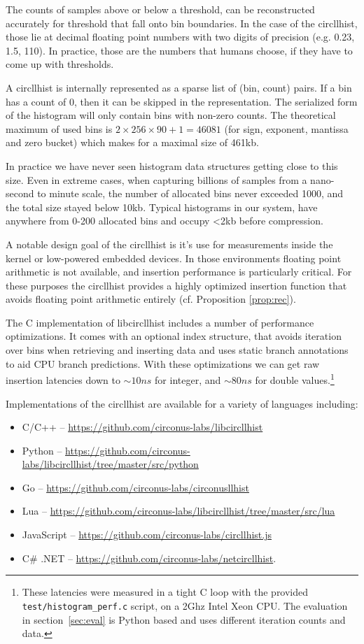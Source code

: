 \documentclass{article}
\theoremstyle{plain}
\theoremstyle{remark}
\begin{document}
The counts of samples above or below a threshold, can be reconstructed accurately for threshold
that fall onto bin boundaries. In the case of the circllhist, those lie at decimal floating point
numbers with two digits of precision (e.g. 0.23, 1.5, 110). In practice, those are the numbers
that humans choose, if they have to come up with thresholds.

A circllhist is internally represented as a sparse list of (bin, count) pairs.  If a bin has a count
of 0, then it can be skipped in the representation.  The serialized form of the histogram will only
contain bins with non-zero counts.  The theoretical maximum of used bins is $2 \times 256 \times 90
+ 1 = 46081$ (for sign, exponent, mantissa and zero bucket) which makes for a maximal size of 461kb.

In practice we have never seen histogram data structures getting close to this size.  Even in
extreme cases, when capturing billions of samples from a nano-second to minute scale, the number of
allocated bins never exceeded 1000, and the total size stayed below 10kb.
Typical histograms in our system, have anywhere from 0-200 allocated bins and occupy <2kb before
compression.

A notable design goal of the circllhist is it's use for measurements inside the kernel or
low-powered embedded devices.  In those environments floating point arithmetic is not available, and
insertion performance is particularly critical. For these purposes the circllhist provides a highly
optimized insertion function that avoids floating point arithmetic entirely (cf. Proposition
\ref{prop:rec}).

The C implementation of libcircllhist includes a number of performance optimizations.  It comes with
an optional index structure, that avoids iteration over bins when retrieving and inserting data and
uses static branch annotations to aid CPU branch predictions.  With these optimizations we can get
raw insertion latencies down to $\sim 10ns$ for integer, and $\sim 80ns$ for double
values.\footnote{ These latencies were measured in a tight C loop with the provided
\texttt{test/histogram\_perf.c} script, on a 2Ghz Intel Xeon CPU.  The evaluation in
section~\ref{sec:eval} is Python based and uses different iteration counts and data. }

Implementations of the circllhist are available for a variety of languages including:
\begin{itemize}
\item C/C++ -- \url{https://github.com/circonus-labs/libcircllhist}
\item Python -- \url{https://github.com/circonus-labs/libcircllhist/tree/master/src/python}
\item Go -- \url{https://github.com/circonus-labs/circonusllhist}
\item Lua -- \url{https://github.com/circonus-labs/libcircllhist/tree/master/src/lua}
\item JavaScript -- \url{https://github.com/circonus-labs/circllhist.js}
\item C\# .NET -- \url{https://github.com/circonus-labs/netcircllhist}.
\end{itemize}
\end{document}
